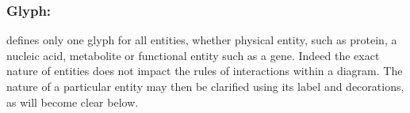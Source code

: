 \color{ForestGreen}

\subsubsection{Glyph: }
\label{sec:entity}

\SBGNERLone defines only one glyph for all entities, whether physical entity, such as protein, a nucleic acid, metabolite or functional entity such as a gene. Indeed the exact nature of entities does not impact the rules of interactions within a diagram. The nature of a particular entity may then be clarified using its label and decorations, as will become clear below. 

